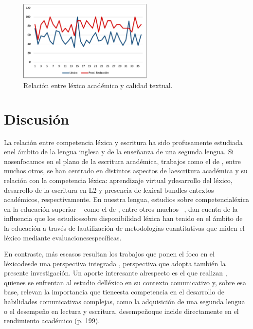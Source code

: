\documentclass{textolivre}
\begin{document}
\begin{figure}[htbp]
 \centering
 \includegraphics[width=0.6\textwidth]{figure04.png}
 \caption{Relación entre léxico académico y calidad textual.}
 \label{fig04}
\end{figure}


\section{Discusión}\label{sec-discusion}
La relación entre competencia léxica y escritura ha sido profusamente estudiada
enel ámbito de la lengua inglesa y de la enseñanza de una segunda lengua. Si
nosenfocamos en el plano de la escritura académica, trabajos como el de \textcite{PrezCaado2010,Yoon2018,Pan2019}, 
entre muchos otros, se han centrado en
distintos aspectos de laescritura académica y su relación con la competencia
léxica: aprendizaje virtual ydesarrollo del léxico, desarrollo de la escritura
en L2 y presencia de lexical bundles entextos académicos, respectivamente. En
nuestra lengua, estudios sobre competencialéxica en la educación superior –
como el de \textcite{RiffoOcares2014,munoz2015,GonzaloZapico2016,Zapico2017,vega2018,Trigo2019},
entre otros muchos –, dan cuenta de la influencia que los estudiossobre
disponibilidad léxica han tenido en el ámbito de la educación a través de
lautilización de metodologías cuantitativas que miden el léxico mediante
evaluacionesespecíficas.

En contraste, más escasos resultan los trabajos que ponen el foco en el
léxicodesde una perspectiva integrada \cite[p. e.]{madrigal2016,gracia2019},
perspectiva que adopta también la presente investigación. Un aporte
interesante alrespecto es el que realizan \textcite{aravena}, quienes se
enfrentan al estudio delléxico en su contexto comunicativo y, sobre esa base,
relevan la importancia que tieneesta competencia en el desarrollo de
habilidades comunicativas complejas, como la adquisición de una segunda lengua
o el desempeño en lectura y escritura, desempeñoque incide directamente en el
rendimiento académico (p. 199). 
\end{document}

